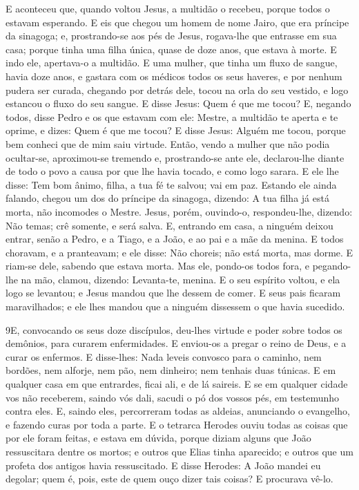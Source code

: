 E aconteceu que, quando voltou Jesus, a multidão o recebeu,
porque todos o estavam esperando. E eis que chegou um homem
de nome Jairo, que era príncipe da sinagoga; e, prostrando-se aos
pés de Jesus, rogava-lhe que entrasse em sua casa; porque
tinha uma filha única, quase de doze anos, que estava à morte. E
indo ele, apertava-o a multidão. E uma mulher, que tinha um
fluxo de sangue, havia doze anos, e gastara com os médicos todos os
seus haveres, e por nenhum pudera ser curada, chegando por
detrás dele, tocou na orla do seu vestido, e logo estancou o fluxo
do seu sangue. E disse Jesus: Quem é que me tocou? E, negando
todos, disse Pedro e os que estavam com ele: Mestre, a multidão te
aperta e te oprime, e dizes: Quem é que me tocou? E disse
Jesus: Alguém me tocou, porque bem conheci que de mim saiu virtude.
Então, vendo a mulher que não podia ocultar-se, aproximou-se
tremendo e, prostrando-se ante ele, declarou-lhe diante de todo o
povo a causa por que lhe havia tocado, e como logo sarara. E
ele lhe disse: Tem bom ânimo, filha, a tua fé te salvou; vai em paz.
Estando ele ainda falando, chegou um dos do príncipe da
sinagoga, dizendo: A tua filha já está morta, não incomodes o
Mestre. Jesus, porém, ouvindo-o, respondeu-lhe, dizendo: Não
temas; crê somente, e será salva. E, entrando em casa, a
ninguém deixou entrar, senão a Pedro, e a Tiago, e a João, e ao pai
e a mãe da menina. E todos choravam, e a pranteavam; e ele
disse: Não choreis; não está morta, mas dorme. E riam-se
dele, sabendo que estava morta. Mas ele, pondo-os todos fora,
e pegando-lhe na mão, clamou, dizendo: Levanta-te, menina. E
o seu espírito voltou, e ela logo se levantou; e Jesus mandou que
lhe dessem de comer. E seus pais ficaram maravilhados; e ele
lhes mandou que a ninguém dissessem o que havia sucedido.

\medskip

\lettrine{9} E, convocando os seus doze discípulos, deu-lhes
virtude e poder sobre todos os demônios, para curarem enfermidades.
E enviou-os a pregar o reino de Deus, e a curar os enfermos.
E disse-lhes: Nada leveis convosco para o caminho, nem bordões,
nem alforje, nem pão, nem dinheiro; nem tenhais duas túnicas. E
em qualquer casa em que entrardes, ficai ali, e de lá saireis. E
se em qualquer cidade vos não receberem, saindo vós dali, sacudi o
pó dos vossos pés, em testemunho contra eles. E, saindo eles,
percorreram todas as aldeias, anunciando o evangelho, e fazendo
curas por toda a parte. E o tetrarca Herodes ouviu todas as
coisas que por ele foram feitas, e estava em dúvida, porque diziam
alguns que João ressuscitara dentre os mortos; e outros que Elias
tinha aparecido; e outros que um profeta dos antigos havia
ressuscitado. E disse Herodes: A João mandei eu degolar; quem é,
pois, este de quem ouço dizer tais coisas? E procurava vê-lo.


